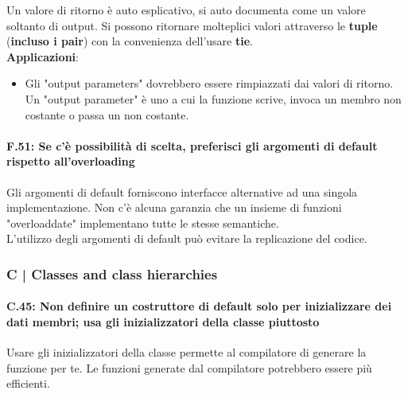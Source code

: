 \textsf{\small Un valore di ritorno è auto esplicativo, si auto documenta come un valore soltanto di output. Si possono ritornare molteplici valori attraverso le \textbf{tuple} (\textbf{incluso i pair}) con la convenienza dell'usare \textbf{tie}.} \\

\textsf{\small \textbf{Applicazioni}: }

\begin{itemize}
	\item \textsf{\small Gli "output parameters" dovrebbero essere rimpiazzati dai valori di ritorno. Un "output parameter" è uno a cui la funzione scrive, invoca un membro non costante o passa un non costante. } %
\end{itemize}

\paragraph{F.51: Se c'è possibilità di scelta, preferisci gli argomenti di default rispetto all'overloading}

\textsf{\small Gli argomenti di default forniscono interfacce alternative ad una singola implementazione. Non c'è alcuna garanzia che un insieme di funzioni "overloaddate" implementano tutte le stesse semantiche. } \\

\textsf{\small L'utilizzo degli argomenti di default può evitare la replicazione del codice.} \\


\subsubsection{C | Classes and class hierarchies}

\paragraph{C.45: Non definire un costruttore di default solo per inizializzare dei dati membri; usa gli inizializzatori della classe piuttosto}

\textsf{\small Usare gli inizializzatori della classe permette al compilatore di generare la funzione per te. Le funzioni generate dal compilatore potrebbero essere più efficienti.} \\


